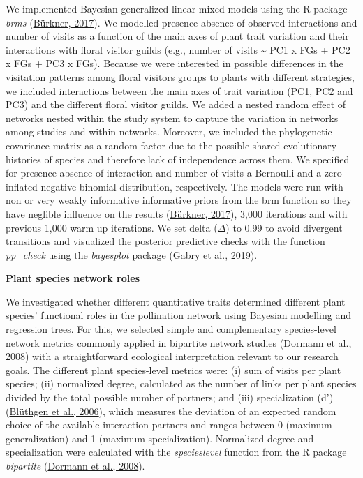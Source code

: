 \documentclass[
  12pt,
  a4paper,
]{article}
\begin{document}
We implemented Bayesian generalized linear mixed models using the R package \emph{brms} (\protect\hyperlink{ref-burkner2017}{Bürkner, 2017}). We modelled presence-absence of observed interactions and number of visits as a function of the main axes of plant trait variation and their interactions with floral visitor guilds (e.g., number of visits \textasciitilde{} PC1 x FGs + PC2 x FGs + PC3 x FGs). Because we were interested in possible differences in the visitation patterns among floral visitors groups to plants with different strategies, we included interactions between the main axes of trait variation (PC1, PC2 and PC3) and the different floral visitor guilds. We added a nested random effect of networks nested within the study system to capture the variation in networks among studies and within networks. Moreover, we included the phylogenetic covariance matrix as a random factor due to the possible shared evolutionary histories of species and therefore lack of independence across them. We specified for presence-absence of interaction and number of visits a Bernoulli and a zero inflated negative binomial distribution, respectively. The models were run with non or very weakly informative informative priors from the brm function so they have neglible influence on the results (\protect\hyperlink{ref-burkner2017}{Bürkner, 2017}), 3,000 iterations and with previous 1,000 warm up iterations. We set delta (\(\Delta\)) to 0.99 to avoid divergent transitions and visualized the posterior predictive checks with the function \emph{pp\_check} using the \emph{bayesplot} package (\protect\hyperlink{ref-gabry2019}{Gabry et al., 2019}).

\textbf{Plant species network roles}

We investigated whether different quantitative traits determined different plant species' functional roles in the pollination network using Bayesian modelling and regression trees. For this, we selected simple and complementary species-level network metrics commonly applied in bipartite network studies (\protect\hyperlink{ref-dormann2008}{Dormann et al., 2008}) with a straightforward ecological interpretation relevant to our research goals. The different plant species-level metrics were: (i) sum of visits per plant species; (ii) normalized degree, calculated as the number of links per plant species divided by the total possible number of partners; and (iii) specialization (d') (\protect\hyperlink{ref-bluthgen2006}{Blüthgen et al., 2006}), which measures the deviation of an expected random choice of the available interaction partners and ranges between 0 (maximum generalization) and 1 (maximum specialization). Normalized degree and specialization were calculated with the \emph{specieslevel} function from the R package \emph{bipartite} (\protect\hyperlink{ref-dormann2008}{Dormann et al., 2008}).
\end{document}
